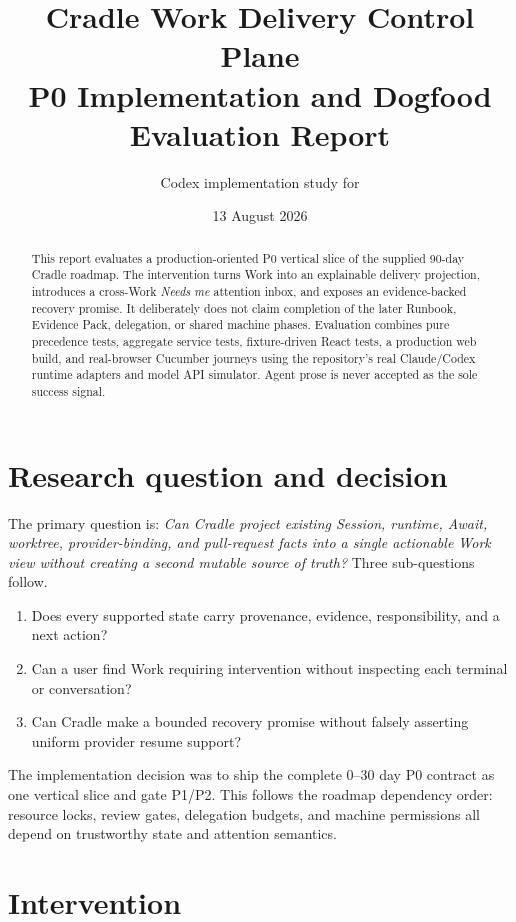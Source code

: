 \documentclass[10pt,a4paper]{article}
\title{\textbf{Cradle Work Delivery Control Plane}\\
P0 Implementation and Dogfood Evaluation Report}
\author{Codex implementation study for \code{wibus-wee/cradle-app}}
\date{13 August 2026}
\begin{document}
\maketitle

\begin{abstract}
This report evaluates a production-oriented P0 vertical slice of the supplied
90-day Cradle roadmap.  The intervention turns Work into an explainable
delivery projection, introduces a cross-Work \emph{Needs me} attention inbox,
and exposes an evidence-backed recovery promise.  It deliberately does not
claim completion of the later Runbook, Evidence Pack, delegation, or shared
machine phases.  Evaluation combines pure precedence tests, aggregate service
tests, fixture-driven React tests, a production web build, and real-browser
Cucumber journeys using the repository's real Claude/Codex runtime adapters and
model API simulator.  Agent prose is never accepted as the sole success signal.
\end{abstract}

\section{Research question and decision}

The primary question is: \emph{Can Cradle project existing Session, runtime,
Await, worktree, provider-binding, and pull-request facts into a single
actionable Work view without creating a second mutable source of truth?}
Three sub-questions follow.

\begin{enumerate}
  \item Does every supported state carry provenance, evidence, responsibility,
        and a next action?
  \item Can a user find Work requiring intervention without inspecting each
        terminal or conversation?
  \item Can Cradle make a bounded recovery promise without falsely asserting
        uniform provider resume support?
\end{enumerate}

The implementation decision was to ship the complete 0--30 day P0 contract as
one vertical slice and gate P1/P2.  This follows the roadmap dependency order:
resource locks, review gates, delegation budgets, and machine permissions all
depend on trustworthy state and attention semantics.

\section{Intervention}
\end{document}
